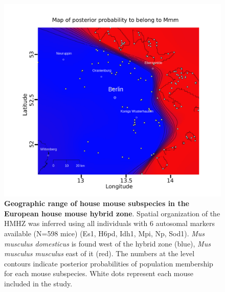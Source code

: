 \begin{figure}[H]
    \centering
    \includegraphics[width=\linewidth,height=\textheight,keepaspectratio]{images/2article1/Figure1.pdf}
    \caption{\textbf{Geographic range of house mouse subspecies in the European house mouse hybrid zone}. Spatial organization of the HMHZ was inferred using all individuals with 6 autosomal markers available (N=598 mice) (Es1, H6pd, Idh1, Mpi, Np, Sod1). \textit{Mus musculus domesticus} is found west of the hybrid zone (blue), \textit{Mus musculus musculus} east of it (red). The numbers at the level contours indicate posterior probabilities of population membership for each mouse subspecies. White dots represent each mouse included in the study.}
\end{figure}

